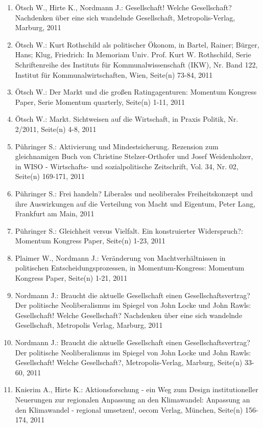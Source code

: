 \begin{enumerate}
    	 \item Ötsch W., Hirte K., Nordmann J.: Gesellschaft! Welche Gesellschaft? Nachdenken über eine sich wandelnde Gesellschaft, Metropolis-Verlag, Marburg, 2011
	 \item Ötsch W.: Kurt Rothschild als politischer Ökonom, in Bartel, Rainer; Bürger, Hans; Klug, Friedrich: In Memoriam Univ. Prof. Kurt W. Rothschild, Serie Schriftenreihe des Instituts für Kommunalwissenschaft (IKW), Nr. Band 122, Institut für Kommunalwirtschaften, Wien, Seite(n) 73-84, 2011
	 \item Ötsch W.: Der Markt und die großen Ratingagenturen: Momentum Kongress Paper, Serie Momentum quarterly, Seite(n) 1-11, 2011
	 \item Ötsch W.: Markt. Sichtweisen auf die Wirtschaft, in Praxis Politik, Nr. 2/2011, Seite(n) 4-8, 2011
	 \item Pühringer S.: Aktivierung und Mindestsicherung. Rezension zum gleichnamigen Buch von Christine Stelzer-Orthofer und Josef Weidenholzer, in WISO - Wirtschafts- und sozialpolitische Zeitschrift, Vol. 34, Nr. 02, Seite(n) 169-171, 2011
	 \item Pühringer S.: Frei handeln? Liberales und neoliberales Freiheitskonzept und ihre Auswirkungen auf die Verteilung von Macht und Eigentum, Peter Lang, Frankfurt am Main, 2011
	 \item Pühringer S.: Gleichheit versus Vielfalt. Ein konstruierter Widerspruch?: Momentum Kongress Paper, Seite(n) 1-23, 2011
	 \item Plaimer W., Nordmann J.: Veränderung von Machtverhältnissen in politischen Entscheidungsprozessen, in Momentum-Kongress: Momentum Kongress Paper, Seite(n) 1-21, 2011
	 \item Nordmann J.: Braucht die aktuelle Gesellschaft einen Gesellschaftsvertrag? Der politische Neoliberalismus im Spiegel von John Locke und John Rawls: Gesellschaft! Welche Gesellschaft? Nachdenken über eine sich wandelnde Gesellschaft, Metropolis Verlag, Marburg, 2011
	 \item Nordmann J.: Braucht die aktuelle Gesellschaft einen Gesellschaftsvertrag? Der politische Neoliberalismus im Spiegel von John Locke und John Rawls: Gesellschaft! Welche Gesellschaft?, Metropolis-Verlag, Marburg, Seite(n) 33-60, 2011
	 \item Knierim A., Hirte K.: Aktionsforschung - ein Weg zum Design institutioneller Neuerungen zur regionalen Anpassung an den Klimawandel: Anpassung an den Klimawandel - regional umsetzen!, oecom Verlag, München, Seite(n) 156-174, 2011

\end{enumerate}
